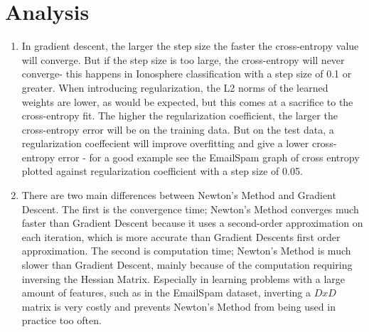 \documentclass[12pt]{article}
\begin{document}
\section{Analysis}
\begin{enumerate}[label=\alph*.]
	\item In gradient descent, the larger the step size the faster the cross-entropy value will converge. But if the step size is too large, the cross-entropy will never converge- this happens in Ionosphere classification with a step size of 0.1 or greater. When introducing regularization, the L2 norms of the learned weights are lower, as would be expected, but this comes at a sacrifice to the cross-entropy fit. The higher the regularization coefficient, the larger the cross-entropy error will be on the training data. But on the test data, a regularization coeffecient will improve overfitting and give a lower cross-entropy error - for a good example see the EmailSpam graph of cross entropy plotted against regularization coefficient with a step size of 0.05.

	\item There are two main differences between Newton's Method and Gradient Descent. The first is the convergence time; Newton's Method converges much faster than Gradient Descent because it uses a second-order approximation on each iteration, which is more accurate than Gradient Descents first order approximation. The second is computation time; Newton's Method is much slower than Gradient Descent, mainly because of the computation requiring inversing the Hessian Matrix. Especially in learning problems with a large amount of features, such as in the EmailSpam dataset, inverting a $D x D$ matrix is very costly and prevents Newton's Method from being used in practice too often. 

\end{enumerate}
\end{document}
